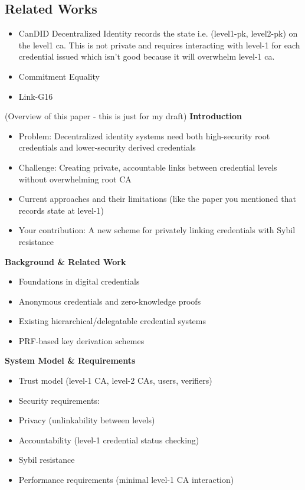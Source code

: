 \subsection{Related Works}
\begin{itemize}
    \item CanDID Decentralized Identity records the state i.e. (level1-pk, level2-pk) on the level1 ca. This is not private and requires interacting with level-1 for each credential issued which isn't good because it will overwhelm level-1 ca.

    \item Commitment Equality

    \item Link-G16
    
\end{itemize}



(Overview of this paper - this is just for my draft)
\textbf{Introduction}
\begin{itemize}
    \item Problem: Decentralized identity systems need both high-security root credentials and lower-security derived credentials
    \item Challenge: Creating private, accountable links between credential levels without overwhelming root CA
    \item Current approaches and their limitations (like the paper you mentioned that records state at level-1)
    \item Your contribution: A new scheme for privately linking credentials with Sybil resistance
\end{itemize}



\noindent \textbf{Background \& Related Work}
\begin{itemize}
    \item Foundations in digital credentials
    \item Anonymous credentials and zero-knowledge proofs
    \item Existing hierarchical/delegatable credential systems
    \item PRF-based key derivation schemes
\end{itemize}


\noindent \textbf{System Model \& Requirements}
\begin{itemize}
    \item Trust model (level-1 CA, level-2 CAs, users, verifiers)
    \item Security requirements:
    \item Privacy (unlinkability between levels)
    \item Accountability (level-1 credential status checking)
    \item Sybil resistance
    \item Performance requirements (minimal level-1 CA interaction)
\end{itemize}


